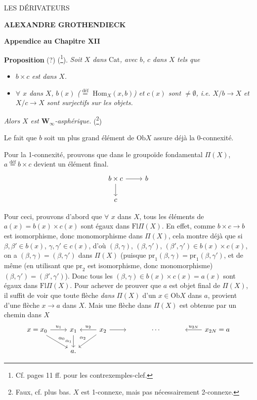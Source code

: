 \documentclass[11pt]{article}
\newcommand{\printedpage}[1]{\marginpar{\footnotesize p.~#1}}
\newcommand{\msp}[1]{\marginpar{\footnotesize [#1]}}
\newcommand{\Hom}{\mathrm{Hom}}
\newcommand{\Fl}{\mathrm{Fl}}
\newcommand{\Ob}{\mathrm{Ob}}
\newcommand{\Cat}{\mathrm{Cat}}
\newcommand{\pr}{\mathrm{pr}}
\newcommand{\deq}{\mathrel{\overset{\text{déf}}{=}}}
\begin{document}
\printedpage{}

\begin{center}
{\LARGE\textsf{LES DÉRIVATEURS}}

\bigskip

\textbf{ALEXANDRE GROTHENDIECK}

\bigskip\bigskip

{\large\textbf{Appendice au Chapitre XII}}
\end{center}

\newpage

\printedpage{1}

\msp{page 1}
\textbf{Proposition} (?) (\footnote{Cf. pages 11 ff. pour les contrexemples-clef.}). \textit{Soit $X$ dans} $\Cat$\textit{, avec $b$, $c$ dans $X$ tels que}

\begin{itemize}
\item[\textit{a)}] \textit{$b\times c$ est dans $X$.}
\item[\textit{b)}] \textit{$\forall$ $x$ dans $X$, $b(x)$ ($\deq$} $\Hom_X(x,b)$\textit{) et $c(x)$ sont $\neq\emptyset$, i.e. $X/b \longrightarrow X$ et $X/c \longrightarrow X$ sont surjectifs sur les objets.}
\end{itemize}

\textit{Alors $X$ est $\mathbf{W}_\infty$-asphérique.} (\footnote{Faux, cf. plus bas. $X$ est 1-connexe, mais pas nécessairement 2-connexe.})

Le fait que $b$ soit un plus grand élément de $\Ob X$ assure déjà la 0-connexité.

Pour la 1-connexité, prouvons que dans le groupoïde fondamental $\Pi(X)$, $a \deq b\times c$ devient un élément final.
\[
\begin{tikzcd}
b\times c \arrow[r] \arrow[d] & b \\
c &
\end{tikzcd}
\]

Pour ceci, prouvons d'abord que $\forall$ $x$ dans $X$, tous les éléments de $a(x) = b(x)\times c(x)$ sont égaux dans $\Fl\Pi(X)$. En effet, comme $b\times c \longrightarrow b$ est isomorphisme, donc monomorphisme dans $\Pi(X)$, cela montre déjà que si $\beta,\beta'\in b(x)$, $\gamma,\gamma'\in c(x)$, d'où $(\beta,\gamma)$, $(\beta,\gamma')$, $(\beta',\gamma')\in b(x)\times c(x)$, on a $(\beta,\gamma) = (\beta,\gamma')$ dans $\Pi(X)$ (puisque $\pr_1(\beta,\gamma) = \pr_1(\beta,\gamma')$, et de même (en utilisant que $\pr_2$ est isomorphisme, donc monomorphisme) $(\beta,\gamma') = (\beta',\gamma')$). Donc tous les $(\beta,\gamma)\in b(x)\times c(x) = a(x)$ sont égaux dans $\Fl\Pi(X)$. Pour achever de prouver que $a$ est objet final de $\Pi(X)$, il suffit de voir que toute flèche \textit{dans} $\Pi(X)$ d'un $x\in\Ob X$ dans $a$, provient d'une flèche $x\longrightarrow a$ dans $X$. Mais une flèche dans $\Pi(X)$ est obtenue par un chemin dans $X$
\[
\begin{tikzcd}
x = x_0 \arrow[r, "u_1"] \arrow[dr, "\alpha_0"] & x_1 \arrow[d, "\alpha_1"'] & x_2 \arrow[l, "u_2"'] \arrow[r] \arrow[dl, "\alpha_2"'] & {} & \cdots & {} & x_{2N} = a \arrow[l, "u_{2N}"'] \\
& a. & & & & &
\end{tikzcd}
\]
\end{document}
